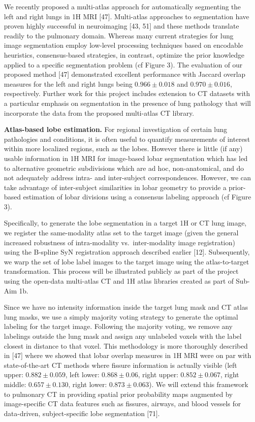 \documentclass[11pt,]{article}
\begin{document}
We recently proposed a multi-atlas approach for automatically segmenting
the left and right lungs in 1H MRI {[}47{]}. Multi-atlas approaches to
segmentation have proven highly successful in neuroimaging {[}43, 51{]}
and these methods translate readily to the pulmonary domain. Whereas
many current strategies for lung image segmentation employ low-level
processing techniques based on encodable heuristics, consensus-based
strategies, in contrast, optimize the prior knowledge applied to a
specific segmentation problem (cf Figure 3). The evaluation of our
proposed method {[}47{]} demonstrated excellent performance with Jaccard
overlap measures for the left and right lungs being \(0.966\pm0.018\)
and \(0.970\pm0.016\), respectively. Further work for this project
includes extension to CT datasets with a particular emphasis on
segmentation in the presence of lung pathology that will incorporate the
data from the proposed multi-atlas CT library.



\textbf{Atlas-based lobe estimation.} For regional investigation of
certain lung pathologies and conditions, it is often useful to quantify
measurements of interest within more localized regions, such as the
lobes. However there is little (if any) usable information in 1H MRI for
image-based lobar segmentation which has led to alternative geometric
subdivisions which are ad hoc, non-anatomical, and do not adequately
address intra- and inter-subject correspondences. However, we can take
advantage of inter-subject similarities in lobar geometry to provide a
prior-based estimation of lobar divisions using a consensus labeling
approach (cf Figure 3).

Specifically, to generate the lobe segmentation in a target 1H or CT
lung image, we register the same-modality atlas set to the target image
(given the general increased robustness of intra-modality
vs.~inter-modality image registration) using the B-spline SyN
registration approach described earlier {[}12{]}. Subsequently, we warp
the set of lobe label images to the target image using the
atlas-to-target transformation. This process will be illustrated
publicly as part of the project using the open-data multi-atlas CT and
1H atlas libraries created as part of Sub-Aim 1b.

Since we have no intensity information inside the target lung mask and
CT atlas lung masks, we use a simply majority voting strategy to
generate the optimal labeling for the target image. Following the
majority voting, we remove any labelings outside the lung mask and
assign any unlabeled voxels with the label closest in distance to that
voxel. This methodology is more thoroughly described in {[}47{]} where
we showed that lobar overlap measures in 1H MRI were on par with
state-of-the-art CT methods where fissure information is actually
visible (left upper: \(0.882 \pm 0.059\), left lower:
\(0.868 \pm 0.06\), right upper: \(0.852 \pm 0.067\), right middle:
\(0.657 \pm 0.130\), right lower: \(0.873 \pm 0.063\)). We will extend
this framework to pulmonary CT in providing spatial prior probability
maps augmented by image-specific CT data features such as fissures,
airways, and blood vessels for data-driven, subject-specific lobe
segmentation {[}71{]}.
\end{document}
